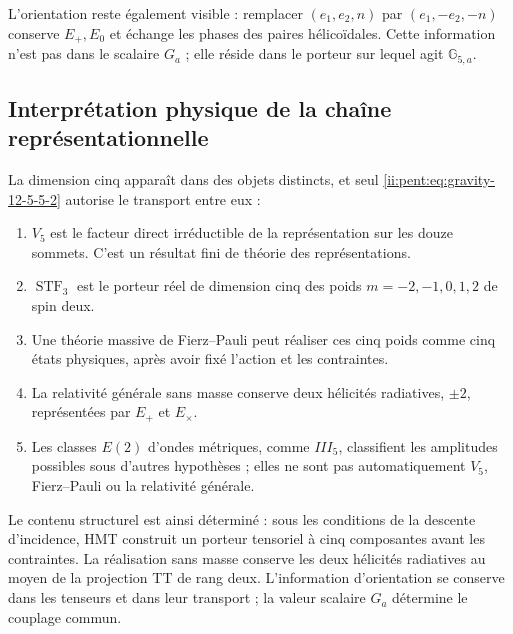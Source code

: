 L’orientation reste également visible : remplacer
\((e_1,e_2,n)\) par \((e_1,-e_2,-n)\) conserve \(E_+,E_0\) et échange
les phases des paires hélicoïdales. Cette information n’est pas dans le
scalaire \(G_a\) ; elle réside dans le porteur sur lequel agit
\(\mathbb G_{5,a}\).

\subsection{Interprétation physique de la chaîne représentationnelle}

La dimension cinq apparaît dans des objets distincts, et seul
\eqref{ii:pent:eq:gravity-12-5-5-2} autorise le transport entre eux :

\begin{enumerate}
\item \(V_5\) est le facteur direct irréductible de la représentation sur les
douze sommets. C’est un résultat fini de théorie des représentations.
\item \(\operatorname{STF}_3\) est le porteur réel de dimension cinq des
poids \(m=-2,-1,0,1,2\) de spin deux.
\item Une théorie massive de Fierz--Pauli peut réaliser ces cinq poids
comme cinq états physiques, après avoir fixé l’action et les contraintes.
\item La relativité générale sans masse conserve deux hélicités radiatives,
\(\pm2\), représentées par \(E_+\) et \(E_\times\).
\item Les classes \(E(2)\) d’ondes métriques, comme \(III_5\), classifient
les amplitudes possibles sous d’autres hypothèses ; elles ne sont pas automatiquement
\(V_5\), Fierz--Pauli ou la relativité générale.
\end{enumerate}

Le contenu structurel est ainsi déterminé : sous les conditions de la
descente d’incidence, HMT construit un porteur tensoriel à cinq
composantes avant les contraintes. La réalisation sans masse conserve
les deux hélicités radiatives au moyen de la projection TT de rang deux.
L’information d’orientation se conserve dans les tenseurs et dans leur
transport ; la valeur scalaire \(G_a\) détermine le couplage commun.
